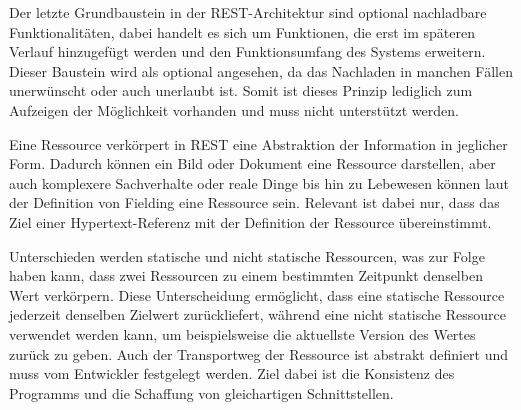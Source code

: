 Der letzte Grundbaustein in der \ac{REST}-Architektur sind optional nachladbare Funktionalitäten, dabei handelt es sich um Funktionen, die erst im späteren Verlauf hinzugefügt werden und den Funktionsumfang des Systems erweitern.
Dieser Baustein wird als optional angesehen, da das Nachladen in manchen Fällen unerwünscht oder auch unerlaubt ist.
Somit ist dieses Prinzip lediglich zum Aufzeigen der Möglichkeit vorhanden und muss nicht unterstützt werden.

Eine Ressource verkörpert in \ac{REST} eine Abstraktion der Information in jeglicher Form. Dadurch können ein Bild oder Dokument eine Ressource darstellen, aber auch komplexere Sachverhalte oder reale Dinge bis hin zu Lebewesen können laut der Definition von Fielding eine Ressource sein.
Relevant ist dabei nur, dass das Ziel einer Hypertext-Referenz mit der Definition der Ressource übereinstimmt.

Unterschieden werden statische und nicht statische Ressourcen, was zur Folge haben kann, dass zwei Ressourcen zu einem bestimmten Zeitpunkt denselben Wert verkörpern.
Diese Unterscheidung ermöglicht, dass eine statische Ressource jederzeit denselben Zielwert zurückliefert, während eine nicht statische Ressource verwendet werden kann, um beispielsweise die aktuellste Version des Wertes zurück zu geben.
Auch der Transportweg der Ressource ist abstrakt definiert und muss vom Entwickler festgelegt werden.
Ziel dabei ist die Konsistenz des Programms und die Schaffung von gleichartigen Schnittstellen.\autocite{rf-fielding2000architectural}\autocite{rf-richardson2013restful}
